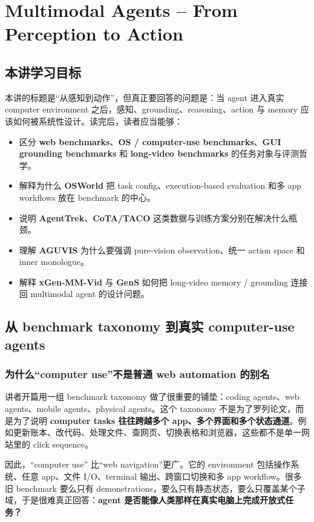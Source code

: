 \chapter{Multimodal Agents – From Perception to Action}
\label{chap:lec07_multimodal_agents_perception_to_action}
\section{本讲学习目标}

本讲的标题是“从感知到动作”，但真正要回答的问题是：当 agent 进入真实 computer environment 之后，感知、grounding、reasoning、action 与 memory 应该如何被系统性设计。读完后，读者应当能够：
\begin{itemize}
\item 区分 \textbf{web benchmarks}、\textbf{OS / computer-use benchmarks}、\textbf{GUI grounding benchmarks} 和 \textbf{long-video benchmarks} 的任务对象与评测哲学。
\item 解释为什么 \textbf{OSWorld} 把 task config、execution-based evaluation 和多 app workflows 放在 benchmark 的中心。
\item 说明 \textbf{AgentTrek}、\textbf{CoTA/TACO} 这类数据与训练方案分别在解决什么瓶颈。
\item 理解 \textbf{AGUVIS} 为什么要强调 pure-vision observation、统一 action space 和 inner monologue。
\item 解释 \textbf{xGen-MM-Vid} 与 \textbf{GenS} 如何把 long-video memory / grounding 连接回 multimodal agent 的设计问题。
\end{itemize}

\section{从 benchmark taxonomy 到真实 computer-use agents}

\subsection{为什么“computer use”不是普通 web automation 的别名}

讲者开篇用一组 benchmark taxonomy 做了很重要的铺垫：coding agents、web agents、mobile agents、physical agents。这个 taxonomy 不是为了罗列论文，而是为了说明 \textbf{computer tasks 往往跨越多个 app、多个界面和多个状态通道}。例如更新账本、改代码、处理文件、查网页、切换表格和浏览器，这些都不是单一网站里的 click sequence。

因此，“computer use” 比“web navigation”更广。它的 environment 包括操作系统、任意 app、文件 I/O、terminal 输出、跨窗口切换和多 app workflow。很多旧 benchmark 要么只有 demonstrations，要么只有静态状态，要么只覆盖某个子域，于是很难真正回答：\textbf{agent 是否能像人类那样在真实电脑上完成开放式任务？}

